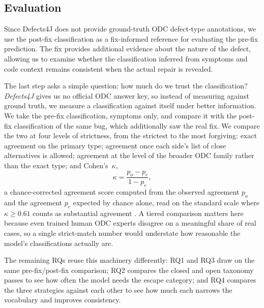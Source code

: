 \subsection{Evaluation}
\label{sec:eval}

Since Defects4J does not provide ground-truth ODC defect-type annotations, we use the post-fix classification as a fix-informed reference for evaluating the pre-fix prediction. The fix provides additional evidence about the nature of the defect, allowing us to examine whether the classification inferred from symptoms and code context remains consistent when the actual repair is revealed.

The last step asks a simple question: how much do we trust the classification?
\textit{Defects4J} gives us no official ODC answer key, so instead of measuring
against ground truth, we measure a classification against itself under better
information. We take the pre-fix classification, symptoms only, and compare it
with the post-fix classification of the same bug, which additionally saw the
real fix. We compare the two at four levels of strictness, from the strictest
to the most
forgiving: exact agreement on the primary type; agreement once each side's list
of close alternatives is allowed; agreement at the level of the broader ODC
family rather than the exact type; and Cohen's~$\kappa$,
\begin{equation}
  \kappa = \frac{p_o - p_e}{1 - p_e},
  \label{eq:kappa}
\end{equation}
a chance-corrected agreement score computed from the observed agreement $p_o$ and
the agreement $p_e$ expected by chance alone, read on the standard scale where
$\kappa \ge 0.61$ counts as substantial agreement \citep{landis1977measurement}.
A tiered comparison matters here because even trained human ODC experts disagree
on a meaningful share of real cases, so a single strict-match number would
understate how reasonable the model's classifications actually are.

The remaining RQs reuse this machinery differently: RQ1 and RQ3
draw on the same pre-fix/post-fix comparison; RQ2 compares the closed and open
taxonomy passes to see how often the model needs the escape category; and RQ4
compares the three strategies against each other to see how much each narrows
the vocabulary and improves consistency.

